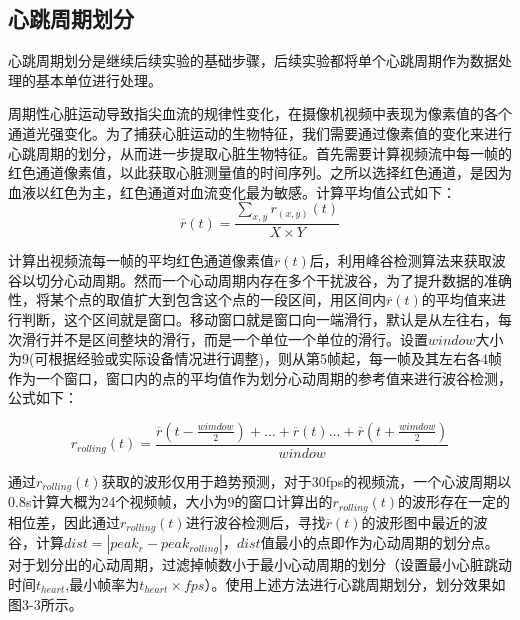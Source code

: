 \subsection{心跳周期划分}
{心跳周期划分是继续后续实验的基础步骤，后续实验都将单个心跳周期作为数据处理的基本单位进行处理。}
\par
{周期性心脏运动导致指尖血流的规律性变化，在摄像机视频中表现为像素值的各个通道光强变化。为了捕获心脏运动的生物特征，我们需要通过像素值的变化来进行心跳周期的划分，从而进一步提取心脏生物特征。首先需要计算视频流中每一帧的红色通道像素值，以此获取心脏测量值的时间序列。之所以选择红色通道，是因为血液以红色为主，红色通道对血流变化最为敏感。计算平均值公式如下：}
\begin{equation}
    \overline{r}(t)=\frac{\sum_{x,y}{r_{(x,y)}(t)}}{X\times Y}
\end{equation}
\par
{
计算出视频流每一帧的平均红色通道像素值$\overline{r}(t)$后，利用峰谷检测算法\cite{2011Reporting}来获取波谷以切分心动周期。然而一个心动周期内存在多个干扰波谷，为了提升数据的准确性，将某个点的取值扩大到包含这个点的一段区间，用区间内$\overline{r}(t)$的平均值来进行判断，这个区间就是窗口。移动窗口就是窗口向一端滑行，默认是从左往右，每次滑行并不是区间整块的滑行，而是一个单位一个单位的滑行。设置$window$大小为9(可根据经验或实际设备情况进行调整)，则从第5帧起，每一帧及其左右各4帧作为一个窗口，窗口内的点的平均值作为划分心动周期的参考值来进行波谷检测，公式如下：
}
\par
\begin{equation}
    r_{rolling}(t)=\frac{\overline{r}(t-\frac{wimdow}{2})+\dots+\overline{r}(t)\dots+ \overline{r}(t+\frac{wimdow}{2})}{window}
\end{equation}
\par
{通过$ r_{rolling}(t)$获取的波形仅用于趋势预测，对于30fps的视频流，一个心波周期以0.8s计算大概为24个视频帧，大小为9的窗口计算出的$ r_{rolling}(t)$的波形存在一定的相位差，因此通过$ r_{rolling}(t)$进行波谷检测后，寻找$\overline{r}(t)$的波形图中最近的波谷，计算$dist=|peak_{r}-peak_{rolling}|$，$dist$值最小的点即作为心动周期的划分点。}
{
对于划分出的心动周期，过滤掉帧数小于最小心动周期的划分（设置最小心脏跳动时间$t_{heart}$,最小帧率为$ t_{heart}\times fps$）。使用上述方法进行心跳周期划分，划分效果如图3-3所示。
}

